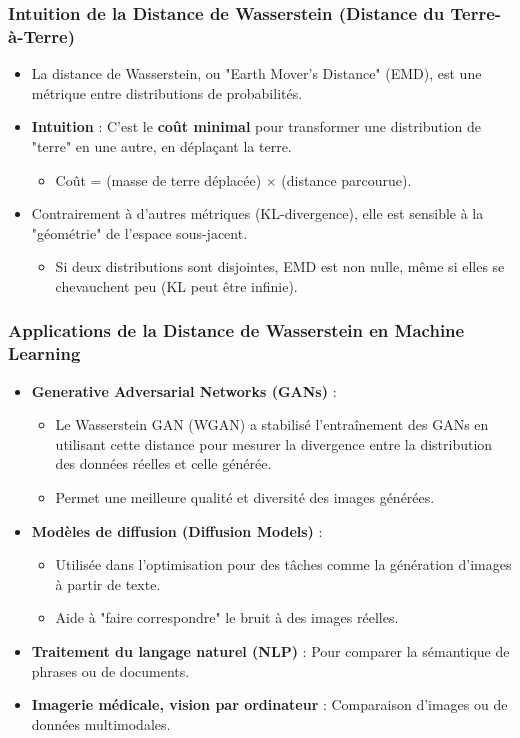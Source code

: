 \documentclass{beamer}
\begin{document}
\begin{frame}
    \frametitle{Intuition de la Distance de Wasserstein (Distance du Terre-à-Terre)}
    \begin{itemize}
        \item La distance de Wasserstein, ou "Earth Mover's Distance" (EMD), est une métrique entre distributions de probabilités.
        \item \textbf{Intuition} : C'est le \textbf{coût minimal} pour transformer une distribution de "terre" en une autre, en déplaçant la terre.
            \begin{itemize}
                \item Coût = (masse de terre déplacée) $\times$ (distance parcourue).
            \end{itemize}
        \item Contrairement à d'autres métriques (KL-divergence), elle est sensible à la "géométrie" de l'espace sous-jacent.
            \begin{itemize}
                \item Si deux distributions sont disjointes, EMD est non nulle, même si elles se chevauchent peu (KL peut être infinie).
            \end{itemize}
    \end{itemize}
\end{frame}

\begin{frame}
    \frametitle{Applications de la Distance de Wasserstein en Machine Learning}
    \begin{itemize}
        \item \textbf{Generative Adversarial Networks (GANs)} :
            \begin{itemize}
                \item Le Wasserstein GAN (WGAN) a stabilisé l'entraînement des GANs en utilisant cette distance pour mesurer la divergence entre la distribution des données réelles et celle générée.
                \item Permet une meilleure qualité et diversité des images générées.
            \end{itemize}
        \item \textbf{Modèles de diffusion (Diffusion Models)} :
            \begin{itemize}
                \item Utilisée dans l'optimisation pour des tâches comme la génération d'images à partir de texte.
                \item Aide à "faire correspondre" le bruit à des images réelles.
            \end{itemize}
        \item \textbf{Traitement du langage naturel (NLP)} : Pour comparer la sémantique de phrases ou de documents.
        \item \textbf{Imagerie médicale, vision par ordinateur} : Comparaison d'images ou de données multimodales.
    \end{itemize}
\end{frame}
\end{document}
